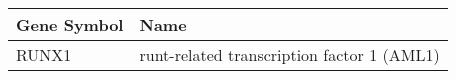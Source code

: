 \begin{tabular}{ll}
\toprule
Gene Symbol &                                        Name \\
\midrule
      RUNX1 & runt-related transcription factor 1  (AML1) \\
\bottomrule
\end{tabular}
